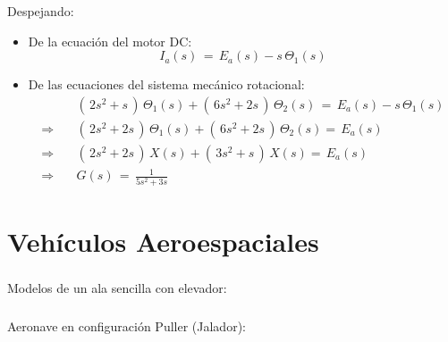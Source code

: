 \documentclass[ 10pt, xcolor = dvipsnames]{beamer}
\begin{document}
\begin{frame}[allowframebreaks]
Despejando: 
\begin{itemize}
\item De la ecuaci\'on del motor DC: 
\[
I_a(s) \, = \, E_a(s) - s \, \Theta_1(s)
\]
\item De las ecuaciones del sistema mec\'anico rotacional: 
\begin{align*}
& ( \, 2 s^2 + s \, ) \, \Theta_1(s) + 
( \, 6 s^2 + 2 s \, ) \, \Theta_2(s) \, = \,
E_a(s) - s \, \Theta_1(s) \\[1ex]
\Longrightarrow \quad
& ( \, 2 s^2 + 2 s \, ) \, \Theta_1(s) + 
( \, 6 s^2 + 2 s \, ) \, \Theta_2(s) = \, E_a(s) \\[1ex]
\Longrightarrow \quad
& ( \, 2 s^2 + 2 s \, ) \, X(s) + 
( \, 3 s^2 + s \, ) \, X(s) = \, E_a(s) \\[1ex]
\Longrightarrow \quad
& G(s) \, = \, \frac{1}{ 5 s^2 + 3s }
\end{align*}
\end{itemize}

\end{frame}

\section{Veh\'iculos Aeroespaciales}

\begin{frame}[allowframebreaks]
\frametitle{\insertsection}

Modelos de un ala sencilla con elevador:
\begin{figure}[htb]
\centering
\def\svgwidth{0.9\columnwidth}

\end{figure}

\end{frame}

\begin{frame}[allowframebreaks]
\frametitle{\insertsection}

Aeronave en configuraci\'on Puller (Jalador): 
\begin{figure}[htb]
\centering
\def\svgwidth{0.9\columnwidth}

\end{figure}

\end{frame}
\end{document}
